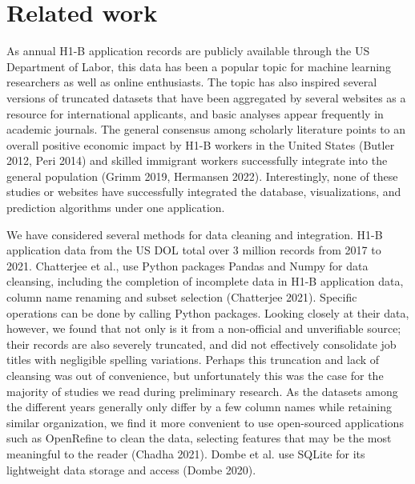 \documentclass[sigconf]{acmart}
\begin{document}
\section{Related work}


As annual H1-B application records are publicly available through the US Department of Labor, 
this data has been a popular topic for machine learning researchers as well as online enthusiasts.  
The topic has also inspired several versions of truncated datasets that have been aggregated by several websites as a resource 
for international applicants, and basic analyses appear frequently in academic journals. The general consensus among 
scholarly literature points to an overall positive economic impact by H1-B workers in the United States (Butler 2012, Peri 2014) and 
skilled immigrant workers successfully integrate into the general population (Grimm 2019, Hermansen 2022). 
Interestingly, none of these studies or websites have successfully integrated the database, 
visualizations, and prediction algorithms under one application. 



We have considered several methods for data cleaning and integration. H1-B application data from the US DOL total over 3 million 
records from 2017 to 2021. Chatterjee et al., use Python packages Pandas and Numpy for data cleansing, including the 
completion of incomplete data in H1-B application data, column name renaming and subset selection (Chatterjee 2021). Specific operations can be done 
by calling Python packages. Looking closely at their data, however, we found that not only is it from a non-official and unverifiable 
source; their records are also severely truncated, and did not effectively consolidate job titles with negligible spelling variations. 
Perhaps this truncation and lack of cleansing was out of convenience, but unfortunately this was the case for the majority of studies 
we read during preliminary research. As the datasets among the different years generally only differ by a few column names while 
retaining similar organization, we find it more convenient to use open-sourced applications such as OpenRefine to clean the data, selecting features 
that may be the most meaningful to the reader (Chadha 2021).  
Dombe et al. use SQLite for its lightweight data storage and access (Dombe 2020).  
\end{document}
